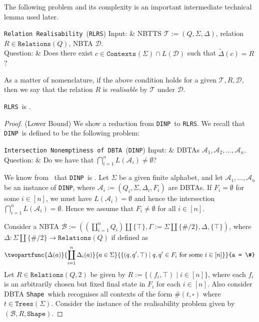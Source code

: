 \documentclass[12pt, a4paper]{article}
\newcommand{\intersectionNonemptiness}{\texttt{DINP}}
\newcommand{\relationRealisability}{\texttt{RLRS}}
\newcommand{\intersectionNonemptinessFull}{\texttt{Intersection Nonemptiness of DBTA}}
\newcommand{\relationRealisabilityFull}{\texttt{Relation Realisability}}
\newcommand{\T}{\mathcal{T}}
\newcommand{\D}{\mathcal{D}}
\newcommand{\Alphabet}{\ensuremath{\Sigma}}
\newcommand{\Trees}[1]{\ensuremath{\texttt{Trees}\left(#1\right)}}
\newcommand{\Contexts}[2]{\ensuremath{\texttt{Contexts}_{#2}\left(#1\right)}}
\newcommand{\Transitions}{\ensuremath{\Delta}}
\newcommand{\Relations}{\texttt{Relations}}
\newcommand{\shape}{\texttt{Shape}}
\newcommand{\automaton}{\ensuremath{\mathcal{A}}}
\newcommand{\automatonB}{\ensuremath{\mathcal{B}}}
\newcommand{\probdef}[3]{
\begin{problem}[framed]{#1}
Input: & #2\\
Question: & #3
\end{problem}
}
\begin{document}
The following problem and its complexity is an important intermediate technical lemma
used later.
\probdef{\relationRealisabilityFull\ (\relationRealisability)}
{NBTTS $\T := (Q, \Alphabet, \Transitions)$, relation $R \in \Relations(Q)$, NBTA $\D$.}
{Does there exist $c \in \Contexts{\Alphabet}{} \cap L(\D)$ such that $\widetilde{\Transitions}(c) = R$?}
As a matter of nomenclature, if the above condition holds for a given $\T, R, \D$, then we say that the relation $R$ is \emph{realisable} by $\T$ under $\D$.

\begin{theorem}\label{thm:relationRealisabilityExptc}
    \relationRealisability\ is \exptc.
\end{theorem}

\begin{proof}
    (Lower Bound) We show a reduction from \intersectionNonemptiness\ to \relationRealisability. We recall that \intersectionNonemptiness\ is defined to be the following problem:
    \probdef{\intersectionNonemptinessFull\ (\intersectionNonemptiness)}
    {DBTAs $\automaton_1, \automaton_2, \dots, \automaton_n$.}
    {Do we have that $\bigcap_{i=1}^n L(\automaton_i) \neq \emptyset$?}
    We know from~\cite{tata} that \intersectionNonemptiness\ is \exptc. Let $\Alphabet$ be a given finite alphabet, and let $\automaton_1, \dots, \automaton_n$ be an instance of \intersectionNonemptiness, where $\automaton_i := (Q_i, \Alphabet, \Transitions_i, F_i)$ are DBTAs. If $F_i = \emptyset$ for some $i \in [n]$, we must have $L(\automaton_i) = \emptyset$ and hence the intersection $\bigcap_{i=1}^n L(\automaton_i) = \emptyset$. Hence we assume that $F_i \neq \emptyset$ for all $i \in [n]$.
    
    Consider a NBTA $\automatonB := \left((\coprod_{i=1}^n Q_i) \coprod \{\top\}, \Gamma := \Alphabet \coprod \{\#/2\}, \Transitions, \{\top\} \right)$, where $\Transitions : \Alphabet \coprod \{\#/2\} \to \Relations(Q)$ if defined as
    \[ \twopartfunc{\Transitions(a)}{\coprod_{i=1}^n \Transitions_i(a)}{a \in \Alphabet}{\{(q, q', \top) \mid q, q' \in F_i \mbox{ for some } i \in [n] \}}{a = \#} \]
    Let $R \in \Relations(Q, 2)$ be given by $R := \{(f_i, \top) \mid i \in [n]\}$, where each $f_i$ is an arbitrarily chosen but fixed final state in $F_i$ for each $i \in [n]$. Also consider DBTA \shape\ which recognises all contexts of the form $\#(t, \square)$ where $t \in \Trees{\Alphabet}$. Consider the instance of the realisability problem given by $(\automatonB, R, \shape)$.
    

\end{proof}
\end{document}
